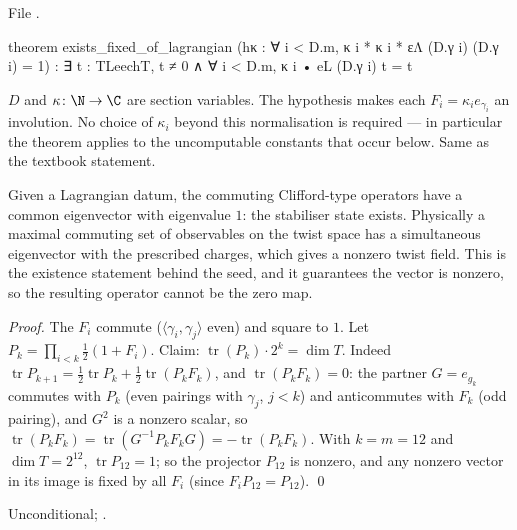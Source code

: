 \noindent File .
\begin{leancode}
theorem exists_fixed_of_lagrangian (hκ : ∀ i < D.m, κ i * κ i * εΛ (D.γ i) (D.γ i) = 1) :
    ∃ t : TLeechT, t ≠ 0 ∧ ∀ i < D.m, κ i • eL (D.γ i) t = t
\end{leancode}
\begin{dictionary}
$D$ and $\kappa\colon\N\to\C$ are section variables. The hypothesis makes each $F_i=\kappa_ie_{\gamma_i}$ an
involution. No choice of $\kappa_i$ beyond this normalisation is required --- in particular the theorem
applies to the uncomputable constants that occur below. Same as the textbook statement.
\end{dictionary}
\begin{physics}
Given a Lagrangian datum, the commuting Clifford-type operators have a common eigenvector with eigenvalue $1$: the stabiliser state exists. Physically a maximal commuting set of observables on the twist space has a simultaneous eigenvector with the prescribed charges, which gives a nonzero twist field. This is the existence statement behind the seed, and it guarantees the vector is nonzero, so the resulting operator cannot be the zero map.
\end{physics}
\noindent\emph{Proof.} The $F_i$ commute ($\langle\gamma_i,\gamma_j\rangle$ even) and square to $1$. Let
$P_k=\prod_{i<k}\tfrac12(1+F_i)$. Claim: $\operatorname{tr}(P_k)\cdot2^k=\dim T$. Indeed
$\operatorname{tr}P_{k+1}=\tfrac12\operatorname{tr}P_k+\tfrac12\operatorname{tr}(P_kF_k)$, and $\operatorname{tr}(P_kF_k)=0$: the
partner $G=e_{g_k}$ commutes with $P_k$ (even pairings with $\gamma_j$, $j<k$) and anticommutes with $F_k$
(odd pairing), and $G^2$ is a nonzero scalar, so
$\operatorname{tr}(P_kF_k)=\operatorname{tr}(G^{-1}P_kF_kG)=-\operatorname{tr}(P_kF_k)$. With $k=m=12$ and $\dim T=2^{12}$,
$\operatorname{tr}P_{12}=1$; so the projector $P_{12}$ is nonzero, and any nonzero vector in its image is fixed by all
$F_i$ (since $F_iP_{12}=P_{12}$). \qed
\begin{status}Unconditional; .\end{status}

